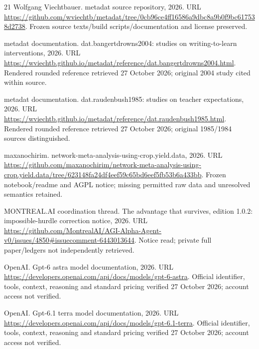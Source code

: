\documentclass[11pt]{article}
\begin{document}
\begin{thebibliography}{21}
Wolfgang Viechtbauer.
\newblock metadat source repository, 2026.
\newblock URL
  \url{https://github.com/wviechtb/metadat/tree/0cb96ce4ff16586a9dbc8a9b0f9bc617538d2738}.
\newblock Frozen source texts/build scripts/documentation and license
  preserved.

{metadat documentation}.
\newblock dat.bangertdrowns2004: studies on writing-to-learn interventions,
  2026{}.
\newblock URL
  \url{https://wviechtb.github.io/metadat/reference/dat.bangertdrowns2004.html}.
\newblock Rendered rounded reference retrieved 27 October 2026; original 2004
  study cited within source.

{metadat documentation}.
\newblock dat.raudenbush1985: studies on teacher expectations,
  2026{}.
\newblock URL
  \url{https://wviechtb.github.io/metadat/reference/dat.raudenbush1985.html}.
\newblock Rendered rounded reference retrieved 27 October 2026; original
  1985/1984 sources distinguished.

{maxanochirim}.
\newblock network-meta-analysis-using-crop.yield.data, 2026.
\newblock URL
  \url{https://github.com/maxanochirim/network-meta-analysis-using-crop.yield.data/tree/623148fa24df4eef59c65bd6eef5fb53b6a433bb}.
\newblock Frozen notebook/readme and AGPL notice; missing permitted raw data
  and unresolved semantics retained.

{MONTREAL.AI coordination thread}.
\newblock The advantage that survives, edition 1.0.2: impossible-hurdle
  correction notice, 2026.
\newblock URL
  \url{https://github.com/MontrealAI/AGI-Alpha-Agent-v0/issues/4850#issuecomment-6443013644}.
\newblock Notice read; private full paper/ledgers not independently retrieved.

{OpenAI}.
\newblock Gpt-6 astra model documentation, 2026{}.
\newblock URL \url{https://developers.openai.com/api/docs/models/gpt-6-astra}.
\newblock Official identifier, tools, context, reasoning and standard pricing
  verified 27 October 2026; account access not verified.

{OpenAI}.
\newblock Gpt-6.1 terra model documentation, 2026{}.
\newblock URL
  \url{https://developers.openai.com/api/docs/models/gpt-6.1-terra}.
\newblock Official identifier, tools, context, reasoning and standard pricing
  verified 27 October 2026; account access not verified.


\end{thebibliography}
\end{document}

